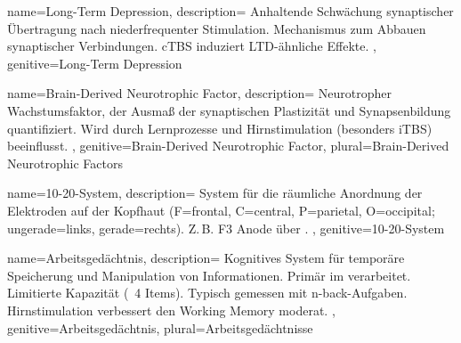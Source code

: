 
{
	name=Long-Term Depression,
	description={
			Anhaltende Schwächung synaptischer Übertragung nach niederfrequenter Stimulation. Mechanismus zum Abbauen synaptischer Verbindungen. \gls{cTBS} induziert LTD-ähnliche Effekte. \cite{esser_level_2006}\newline
		},
	genitive=Long-Term Depression
}


{
	name=Brain-Derived Neurotrophic Factor,
	description={
			Neurotropher Wachstumsfaktor, der Ausmaß der synaptischen Plastizität und Synapsenbildung quantifiziert. Wird durch Lernprozesse und Hirnstimulation (besonders \gls{iTBS}) beeinflusst. \cite{cavaleiro_memory_2020}\newline
		},
	genitive=Brain-Derived Neurotrophic Factor,
	plural=Brain-Derived Neurotrophic Factors
}



{
	name=10-20-System,
	description={
			System für die räumliche Anordnung der Elektroden auf der Kopfhaut (F=frontal, C=central, P=parietal, O=occipital; ungerade=links, gerade=rechts). Z.\,B. F3 Anode über . \cite{woods_technical_2016, caulfield_optimized_2022}\newline
		},
	genitive=10-20-System
}


{
	name=Arbeitsgedächtnis,
	description={
			Kognitives System für temporäre Speicherung und Manipulation von Informationen. Primär im  verarbeitet. Limitierte Kapazität (~4 Items). Typisch gemessen mit n-back-Aufgaben. Hirnstimulation verbessert den Working Memory moderat. \cite{hoy_enhancement_2016, senkowski_boosting_2022}\newline
		},
	genitive=Arbeitsgedächtnis,
	plural=Arbeitsgedächtnisse
}

